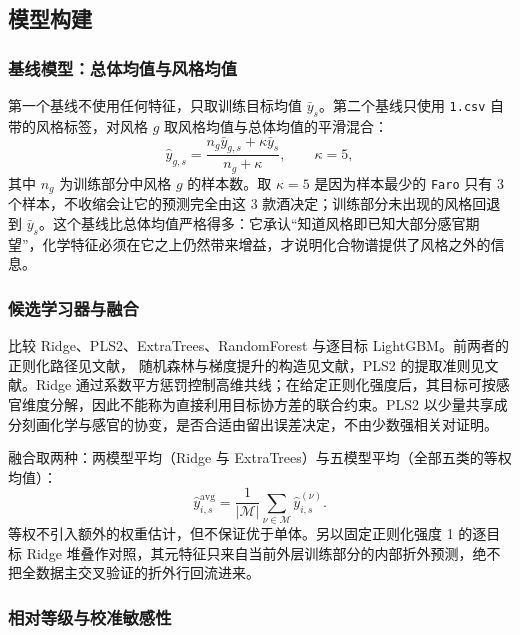 \documentclass[UTF8,a4paper,zihao=-4]{ctexart}
\numberwithin{figure}{section}
\numberwithin{table}{section}
\numberwithin{equation}{section}
\newcommand{\file}[1]{\texttt{#1}}
\begin{document}
\subsection{模型构建}

\subsubsection{基线模型：总体均值与风格均值}

第一个基线不使用任何特征，只取训练目标均值 $\bar y_s$。第二个基线只使用 \file{1.csv} 自带的风格标签，对风格 $g$ 取风格均值与总体均值的平滑混合：
\begin{equation}
\hat y_{g,s}=\frac{n_{g}\bar y_{g,s}+\kappa\bar y_{s}}{n_{g}+\kappa},\qquad \kappa=5,
\label{eq:style-baseline}
\end{equation}
其中 $n_g$ 为训练部分中风格 $g$ 的样本数。取 $\kappa=5$ 是因为样本最少的 \file{Faro} 只有 3 个样本，不收缩会让它的预测完全由这 3 款酒决定；训练部分未出现的风格回退到 $\bar y_s$。这个基线比总体均值严格得多：它承认“知道风格即已知大部分感官期望”，化学特征必须在它之上仍然带来增益，才说明化合物谱提供了风格之外的信息。

\subsubsection{候选学习器与融合}

比较 Ridge、PLS2、ExtraTrees、RandomForest 与逐目标 LightGBM。前两者的正则化路径见文献\cite{lihang}，
随机森林与梯度提升的构造见文献\cite{zhouzhihua}，PLS2 的提取准则见文献\cite{wanghuiwen}。Ridge 通过系数平方惩罚控制高维共线；在给定正则化强度后，其目标可按感官维度分解，因此不能称为直接利用目标协方差的联合约束。PLS2 以少量共享成分刻画化学与感官的协变，是否合适由留出误差决定，不由少数强相关对证明。

融合取两种：两模型平均（Ridge 与 ExtraTrees）与五模型平均（全部五类的等权均值）：
\begin{equation}
\hat y_{i,s}^{\mathrm{avg}}=\frac{1}{|\mathcal{M}|}\sum_{\nu\in\mathcal{M}}\hat y_{i,s}^{(\nu)}.
\label{eq:fusion}
\end{equation}
等权不引入额外的权重估计，但不保证优于单体。另以固定正则化强度 1 的逐目标 Ridge 堆叠作对照，其元特征只来自当前外层训练部分的内部折外预测，绝不把全数据主交叉验证的折外行回流进来。

\subsubsection{相对等级与校准敏感性}
\end{document}

